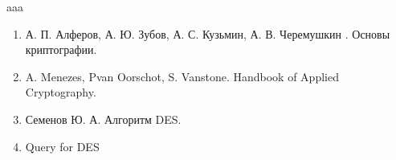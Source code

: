 %



aaa
\begin{enumerate}
    \item А. П. Алферов, А. Ю. Зубов, А. С. Кузьмин, А. В. Черемушкин . Основы криптографии.
    \item A. Menezes, Pvan Oorschot, S. Vanstone. Handbook of Applied Cryptography.
    \item Семенов Ю. А. Алгоритм DES.
    \item Query for DES
\end{enumerate}










